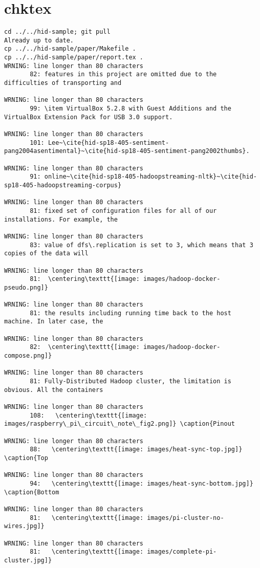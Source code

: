 \appendix
\section{chktex}
\begin{tiny}
\begin{verbatim}
cd ../../hid-sample; git pull
Already up to date.
cp ../../hid-sample/paper/Makefile .
cp ../../hid-sample/paper/report.tex .
WRNING: line longer than 80 characters
       82: features in this project are omitted due to the difficulties of transporting and 

WRNING: line longer than 80 characters
       99: \item VirtualBox 5.2.8 with Guest Additions and the VirtualBox Extension Pack for USB 3.0 support.

WRNING: line longer than 80 characters
       101: Lee~\cite{hid-sp18-405-sentiment-pang2004asentimental}~\cite{hid-sp18-405-sentiment-pang2002thumbs}.

WRNING: line longer than 80 characters
       91: online~\cite{hid-sp18-405-hadoopstreaming-nltk}~\cite{hid-sp18-405-hadoopstreaming-corpus}

WRNING: line longer than 80 characters
       81: fixed set of configuration files for all of our installations. For example, the 

WRNING: line longer than 80 characters
       83: value of dfs\.replication is set to 3, which means that 3 copies of the data will 

WRNING: line longer than 80 characters
       81: 	\centering\texttt{[image: images/hadoop-docker-pseudo.png]}

WRNING: line longer than 80 characters
       81: the results including running time back to the host machine. In later case, the 

WRNING: line longer than 80 characters
       82: 	\centering\texttt{[image: images/hadoop-docker-compose.png]}

WRNING: line longer than 80 characters
       81: Fully-Distributed Hadoop cluster, the limitation is obvious. All the containers 

WRNING: line longer than 80 characters
       108:   \centering\texttt{[image: images/raspberry\_pi\_circuit\_note\_fig2.png]} \caption{Pinout

WRNING: line longer than 80 characters
       88:   \centering\texttt{[image: images/heat-sync-top.jpg]} \caption{Top

WRNING: line longer than 80 characters
       94:   \centering\texttt{[image: images/heat-sync-bottom.jpg]} \caption{Bottom

WRNING: line longer than 80 characters
       81:   \centering\texttt{[image: images/pi-cluster-no-wires.jpg]}

WRNING: line longer than 80 characters
       81:   \centering\texttt{[image: images/complete-pi-cluster.jpg]}

\end{verbatim}
\end{tiny}

